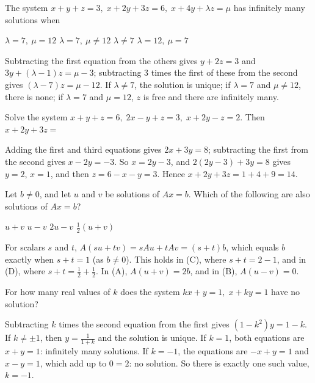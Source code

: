 \begin{question}[id=sys-9, marks=2]
The system $x + y + z = 3,\; x + 2y + 3z = 6,\; x + 4y + \lambda z = \mu$ has infinitely many solutions when
\begin{options}
  \correct $\lambda = 7,\ \mu = 12$
  \option $\lambda = 7,\ \mu \ne 12$
  \option $\lambda \ne 7$
  \option $\lambda = 12,\ \mu = 7$
\end{options}
\begin{solution}
Subtracting the first equation from the others gives $y + 2z = 3$ and $3y + (\lambda - 1)z = \mu - 3$; subtracting 3 times the first of these from the second gives $(\lambda - 7)z = \mu - 12$. If $\lambda \ne 7$, the solution is unique; if $\lambda = 7$ and $\mu \ne 12$, there is none; if $\lambda = 7$ and $\mu = 12$, $z$ is free and there are infinitely many.
\end{solution}
\end{question}

\begin{question}[id=sys-10]
Solve the system $x + y + z = 6,\; 2x - y + z = 3,\; x + 2y - z = 2$. Then $x + 2y + 3z =$
\begin{solution}
Adding the first and third equations gives $2x + 3y = 8$; subtracting the first from the second gives $x - 2y = -3$. So $x = 2y - 3$, and $2(2y - 3) + 3y = 8$ gives $y = 2$, $x = 1$, and then $z = 6 - x - y = 3$. Hence $x + 2y + 3z = 1 + 4 + 9 = 14$.
\end{solution}
\end{question}

\begin{question}[id=sys-11, type=msq, marks=2]
Let $b \ne 0$, and let $u$ and $v$ be solutions of $Ax = b$. Which of the following are also solutions of $Ax = b$?
\begin{options}
  \option $u + v$
  \option $u - v$
  \correct $2u - v$
  \correct $\tfrac{1}{2}(u + v)$
\end{options}
\begin{solution}
For scalars $s$ and $t$, $A(su + tv) = sAu + tAv = (s + t)b$, which equals $b$ exactly when $s + t = 1$ (as $b \ne 0$). This holds in (C), where $s + t = 2 - 1$, and in (D), where $s + t = \tfrac{1}{2} + \tfrac{1}{2}$. In (A), $A(u + v) = 2b$, and in (B), $A(u - v) = 0$.
\end{solution}
\end{question}

\begin{question}[id=sys-12, marks=2]
For how many real values of $k$ does the system $kx + y = 1,\; x + ky = 1$ have no solution?
\begin{solution}
Subtracting $k$ times the second equation from the first gives $(1 - k^2)y = 1 - k$. If $k \ne \pm 1$, then $y = \frac{1}{1 + k}$ and the solution is unique. If $k = 1$, both equations are $x + y = 1$: infinitely many solutions. If $k = -1$, the equations are $-x + y = 1$ and $x - y = 1$, which add up to $0 = 2$: no solution. So there is exactly one such value, $k = -1$.
\end{solution}
\end{question}

